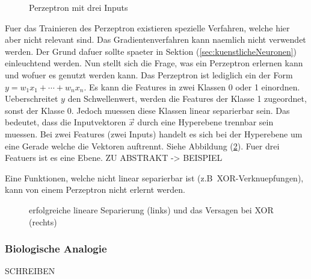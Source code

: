 \documentclass[../main]{subfiles}
\begin{document}
\begin{figure}[h!]
  \centering
  \caption{Perzeptron mit drei Inputs}
  \label{fi:perzeptron}
\end{figure}

Fuer das Trainieren des Perzeptron existieren spezielle Verfahren, welche hier
aber nicht relevant sind. Das Gradientenverfahren kann naemlich nicht verwendet
werden. Der Grund dafuer sollte spaeter in Sektion (\ref{sec:kuenstlicheNeuronen}) einleuchtend werden.
\para{}
Nun stellt sich die Frage, was ein Perzeptron erlernen kann und wofuer es genutzt werden kann.
Das Perzeptron ist lediglich ein  der Form
$y=w_1x_1+\cdots+w
_nx_n$.
Es kann die Features in zwei Klassen 0 oder 1 einordnen.
Ueberschreitet $y$ den Schwellenwert, werden die Features der Klasse 1 zugeordnet, sonst
der Klasse 0.
Jedoch muessen diese Klassen linear separierbar sein.
Das bedeutet, dass die Inputvektoren $\vec{x}$ durch eine Hyperebene trennbar
sein muessen.
Bei zwei Features (zwei Inputs) handelt es sich bei der Hyperebene um eine
Gerade welche die Vektoren auftrennt. Siehe Abbildung (\ref{fig:linearer_Klassifikator}).
Fuer drei Featuers ist es eine Ebene.
ZU ABSTRAKT -> BEISPIEL

Eine Funktionen, welche nicht linear separierbar ist (z.B\ XOR-Verknuepfungen),
kann von einem Perzeptron nicht erlernt werden.

\begin{figure}[h!]

  \caption{erfolgreiche lineare Separierung (links) und das Versagen bei XOR (rechts)}
  \label{fig:linearer_Klassifikator}
\end{figure}

\cite{wiki:perzeptron}

\subsubsection{Biologische Analogie}
SCHREIBEN
\end{document}
